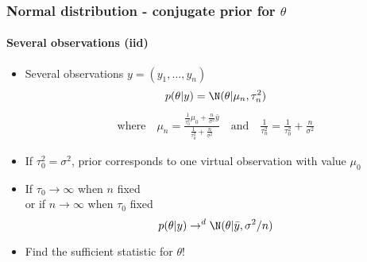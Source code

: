 \documentclass[10pt]{beamer}
\begin{document}
\begin{frame}

\frametitle{Normal distribution - conjugate prior for $\theta$}
\framesubtitle{Several observations (iid)}

  \begin{itemize}
  \item Several observations $y=(y_1,\ldots,y_n)$
    \begin{align*}
      p(\theta|y) = \N(\theta|\mu_n,\tau_n^2)
    \end{align*}
    \vskip -6mm
    \begin{align*}
      \text{where} \quad
      \mu_n=\frac{\frac{1}{\tau_0^2}\mu_0+\frac{n}{\sigma^2}\bar{y}}{\frac{1}{\tau_0^2}+\frac{n}{\sigma^2}} \quad
      \text{and} \quad \frac{1}{\tau_n^2} = \frac{1}{\tau_0^2}+\frac{n}{\sigma^2}
    \end{align*}
  \item If $\tau_0^2=\sigma^2$, prior corresponds to one virtual observation with value $\mu_0$
    \pause
    \item If $\tau_0\rightarrow\infty$ when $n$ fixed\\
      or if $n\rightarrow\infty$ when $\tau_0$ fixed
      \begin{equation*}
        p(\theta|y) \rightarrow^d \N(\theta|\bar{y},\sigma^2/n)
      \end{equation*}
      \pause
      \item Find the {\color{uured}sufficient statistic} for $\theta$!
  \end{itemize}

\end{frame}
\end{document}
